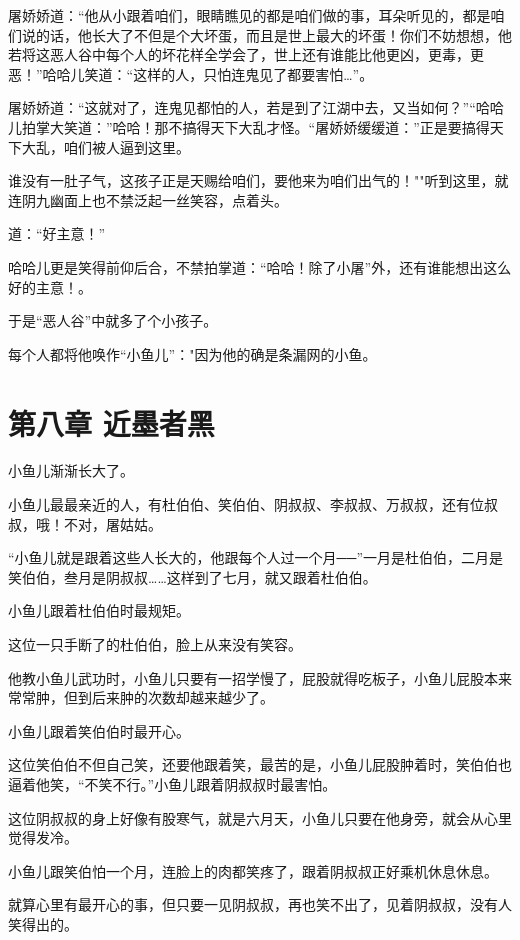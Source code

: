 \documentclass[12pt,oneside]{book}
\begin{document}
屠娇娇道：``他从小跟着咱们，眼睛瞧见的都是咱们做的事，耳朵听见的，都是咱们说的话，他长大了不但是个大坏蛋，而且是世上最大的坏蛋！你们不妨想想，他若将这恶人谷中每个人的坏花样全学会了，世上还有谁能比他更凶，更毒，更恶！''哈哈儿笑道：``这样的人，只怕连鬼见了都要害怕\ldots{}''。

屠娇娇道：``这就对了，连鬼见都怕的人，若是到了江湖中去，又当如何？''``哈哈儿拍掌大笑道：''哈哈！那不搞得天下大乱才怪。``屠娇娇缓缓道：''正是要搞得天下大乱，咱们被人逼到这里。

谁没有一肚子气，这孩子正是天赐给咱们，要他来为咱们出气的！""听到这里，就连阴九幽面上也不禁泛起一丝笑容，点着头。

道：``好主意！''

哈哈儿更是笑得前仰后合，不禁拍掌道：``哈哈！除了小屠''外，还有谁能想出这么好的主意！。

于是``恶人谷''中就多了个小孩子。

每个人都将他唤作``小鱼儿''："因为他的确是条漏网的小鱼。

\hypertarget{ux7b2cux516bux7ae0-ux8fd1ux58a8ux8005ux9ed1}{%
\chapter{第八章
近墨者黑}\label{ux7b2cux516bux7ae0-ux8fd1ux58a8ux8005ux9ed1}}

小鱼儿渐渐长大了。

小鱼儿最最亲近的人，有杜伯伯、笑伯伯、阴叔叔、李叔叔、万叔叔，还有位叔叔，哦！不对，屠姑姑。

``小鱼儿就是跟着这些人长大的，他跟每个人过一个月──''一月是杜伯伯，二月是笑伯伯，叁月是阴叔叔\ldots\ldots 这样到了七月，就又跟着杜伯伯。

小鱼儿跟着杜伯伯时最规矩。

这位一只手断了的杜伯伯，脸上从来没有笑容。

他教小鱼儿武功时，小鱼儿只要有一招学慢了，屁股就得吃板子，小鱼儿屁股本来常常肿，但到后来肿的次数却越来越少了。

小鱼儿跟着笑伯伯时最开心。

这位笑伯伯不但自己笑，还要他跟着笑，最苦的是，小鱼儿屁股肿着时，笑伯伯也逼着他笑，``不笑不行。''小鱼儿跟着阴叔叔时最害怕。

这位阴叔叔的身上好像有股寒气，就是六月天，小鱼儿只要在他身旁，就会从心里觉得发冷。

小鱼儿跟笑伯怕一个月，连脸上的肉都笑疼了，跟着阴叔叔正好乘机休息休息。

就算心里有最开心的事，但只要一见阴叔叔，再也笑不出了，见着阴叔叔，没有人笑得出的。
\end{document}
